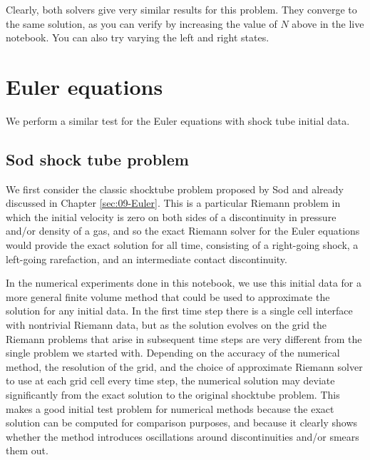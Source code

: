 \documentclass{SIAMbook2016}
\begin{document}
Clearly, both solvers give very similar results for this problem. They
converge to the same solution, as you can verify by increasing the value
of \(N\) above in the live notebook. You can also try varying the left
and right states.

\hypertarget{euler-equations}{%
\section{Euler equations}\label{euler-equations}}

We perform a similar test for the Euler equations with shock tube
initial data.

\hypertarget{sod-shock-tube-problem}{%
\subsection{Sod shock tube problem}\label{sod-shock-tube-problem}}

We first consider the classic shocktube problem proposed by Sod and
already discussed in Chapter \ref{sec:09-Euler}. This is a particular
Riemann problem in which the initial velocity is zero on both sides of a
discontinuity in pressure and/or density of a gas, and so the exact
Riemann solver for the Euler equations would provide the exact solution
for all time, consisting of a right-going shock, a left-going
rarefaction, and an intermediate contact discontinuity.

In the numerical experiments done in this notebook, we use this initial
data for a more general finite volume method that could be used to
approximate the solution for any initial data. In the first time step
there is a single cell interface with nontrivial Riemann data, but as
the solution evolves on the grid the Riemann problems that arise in
subsequent time steps are very different from the single problem we
started with. Depending on the accuracy of the numerical method, the
resolution of the grid, and the choice of approximate Riemann solver to
use at each grid cell every time step, the numerical solution may
deviate significantly from the exact solution to the original shocktube
problem. This makes a good initial test problem for numerical methods
because the exact solution can be computed for comparison purposes, and
because it clearly shows whether the method introduces oscillations
around discontinuities and/or smears them out.
\end{document}
